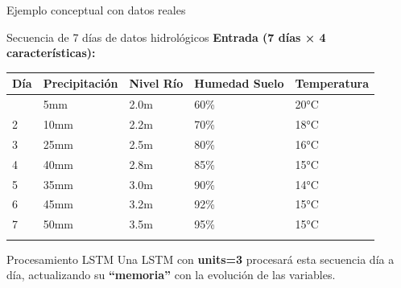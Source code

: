 \documentclass[
  ignorenonframetext,
]{beamer}
\begin{document}
\begin{frame}{Ejemplo conceptual con datos reales}
\label{ejemplo-conceptual-con-datos-reales}
\begin{block}{Secuencia de 7 días de datos hidrológicos}
\label{secuencia-de-7-duxedas-de-datos-hidroluxf3gicos}
\textbf{Entrada (7 días × 4 características):}

\begin{longtable}[]{@{}lllll@{}}
\toprule\noalign{}
Día & Precipitación & Nivel Río & Humedad Suelo & Temperatura \\
\midrule\noalign{}
\endhead
1 & 5mm & 2.0m & 60\% & 20°C \\
2 & 10mm & 2.2m & 70\% & 18°C \\
3 & 25mm & 2.5m & 80\% & 16°C \\
4 & 40mm & 2.8m & 85\% & 15°C \\
5 & 35mm & 3.0m & 90\% & 14°C \\
6 & 45mm & 3.2m & 92\% & 15°C \\
7 & 50mm & 3.5m & 95\% & 15°C \\
\bottomrule\noalign{}
\end{longtable}
\end{block}

\begin{block}{Procesamiento LSTM}
\label{procesamiento-lstm}
Una LSTM con \textbf{units=3} procesará esta secuencia día a día,
actualizando su \textbf{``memoria''} con la evolución de las variables.
\end{block}
\end{frame}
\end{document}
